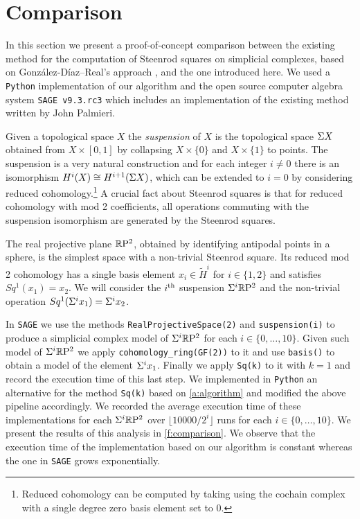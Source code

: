 
\section{Comparison} \label{s:comparison}

In this section we present a proof-of-concept comparison between the existing method for the computation of Steenrod squares on simplicial complexes, based on Gonz\'alez-D\'iaz--Real's approach \cite[Corollary 3.2]{gonzalez1999combinatorial}, and the one introduced here.
We used a \verb|Python| implementation of our algorithm and the open source computer algebra system \verb|SAGE v9.3.rc3| \cite{sagemath} which includes an implementation of the existing method written by John Palmieri.

Given a topological space $X$ the \textit{suspension} of $X$ is the topological space $\Sigma X$ obtained from $X \times [0,1]$ by collapsing $X \times \{0\}$ and $X \times \{1\}$ to points.
The suspension is a very natural construction and for each integer $i \neq 0$ there is an isomorphism $H^i(X) \cong H^{i+1}(\Sigma X)$, which can be extended to $i = 0$ by considering reduced cohomology.\footnote{Reduced cohomology can be computed by taking using the cochain complex with a single degree zero basis element set to $0$.}
A crucial fact about Steenrod squares is that for reduced cohomology with mod 2 coefficients, all operations commuting with the suspension isomorphism are generated by the Steenrod squares.

The real projective plane $\mathbb{R}\mathrm{P}^2$, obtained by identifying antipodal points in a sphere, is the simplest space with a non-trivial Steenrod square.
Its reduced mod 2 cohomology has a single basis element $x_i \in \widetilde{H}^i$ for $i \in \{1, 2\}$ and satisfies $Sq^1(x_1) = x_2$.
We will consider the $i^\mathrm{th}$ suspension $\Sigma^i \mathbb{R}\mathrm{P}^2$ and the non-trivial operation $Sq^1(\Sigma^i x_1) = \Sigma^i x_2$.

In \verb|SAGE| we use the methods \verb|RealProjectiveSpace(2)| and \verb|suspension(i)| to produce a simplicial complex model of $\Sigma^i \mathbb{R}\mathrm{P}^2$ for each $i \in \{0, \dots, 10\}$.
Given such model of $\Sigma^i \mathbb{R}\mathrm{P}^2$ we apply \verb|cohomology_ring(GF(2))| to it and use \verb|basis()| to obtain a model of the element $\Sigma^i x_1$.
Finally we apply \verb|Sq(k)| to it with $k=1$ and record the execution time of this last step.
We implemented in \verb|Python| an alternative for the method \verb|Sq(k)| based on \cref{a:algorithm} and modified the above pipeline accordingly.
We recorded the average execution time of these implementations for each $\Sigma^i \mathbb{R}\mathrm{P}^2$ over $\lfloor 10000/2^i \rfloor$ runs for each $i \in \{0, \dots, 10\}$. We present the results of this analysis in \cref{f:comparison}.
We observe that the execution time of the implementation based on our algorithm is constant whereas the one in \verb|SAGE| grows exponentially.

